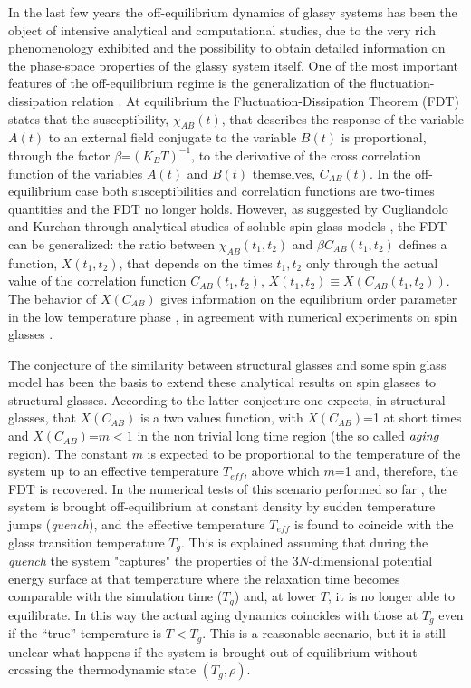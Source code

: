 In the last few years the off-equilibrium dynamics of glassy systems
has been the object of intensive analytical and computational studies,
due to the very rich phenomenology exhibited and the possibility to obtain
detailed information on the
phase-space properties of the glassy system itself.
One of the most important features of the off-equilibrium regime is
the generalization of the fluctuation-dissipation relation \cite{BOUCH}.
At equilibrium the Fluctuation-Dissipation Theorem (FDT) \cite{PARSTA}
states that the susceptibility, $\chi_{AB}(t)$, that describes the response of
the variable $A(t)$ to an external field conjugate to the variable $B(t)$
is proportional, through the factor $\beta$=$( K_B T )^{-1}$,
to the derivative of the cross correlation function of the variables
$A(t)$ and $B(t)$ themselves, $C_{AB}(t)$. In the off-equilibrium case both
susceptibilities and correlation functions are two-times
quantities and the FDT no longer holds. However, as suggested
by Cugliandolo and Kurchan through analytical studies of soluble spin
glass models \cite{CUGLI}, the FDT can be generalized: the ratio between
$\chi_{AB}(t_1,t_2)$ and $\beta \dot C_{AB}(t_1,t_2)$ defines
a function, $X(t_1,t_2)$, that depends on the times $t_1,t_2$ only
through the actual value of the correlation function $C_{AB}(t_1,t_2)$,
$X(t_1,t_2)$$\equiv$$X(C_{AB}(t_1,t_2))$. The behavior of $X(C_{AB})$ 
gives information on the equilibrium order parameter in the low temperature
phase \cite{CUGLI,FRME,FRMEPAPE}, in agreement with numerical 
experiments on spin glasses \cite{MAPARIRUZU}. 

The conjecture of the similarity between structural glasses and
some spin glass model \cite{equiv} has been the basis to extend
these analytical results on spin glasses to structural glasses.
According to the latter conjecture one expects, in structural glasses,
that $X(C_{AB})$ is a two values function, with $X(C_{AB})$=1 at short
times and $X(C_{AB})$=$m \! < \! 1$ in the non trivial long time region
(the so called ${\it aging}$ region). The constant $m$ is expected to be
proportional to the temperature of the system up to an effective temperature
$T_{\!e\!f\!\!f}$, above which $m$=1 and, therefore, the FDT is recovered.
In the numerical tests of this scenario performed so far \cite{PABA},
the system is brought off-equilibrium at constant density by sudden
temperature jumps ({\it quench}), and the effective temperature
$T_{\!e\!f\!\!f}$ is found to coincide with the glass transition
temperature $T_g$. This is explained assuming that during
the {\it quench} the system "captures" the properties of the 3$N$-dimensional
potential energy surface at that temperature where the relaxation time
becomes comparable with the simulation time ($T_g$) and, at lower
$T$, it is no longer able to equilibrate. In this way the actual
aging dynamics coincides with those at $T_g$ even if the ``true'' temperature
is $T$$<$$T_g$. This is a reasonable scenario, but it is still unclear what
happens if the system is brought out of equilibrium without crossing the
thermodynamic state $(T_g,\rho)$.

